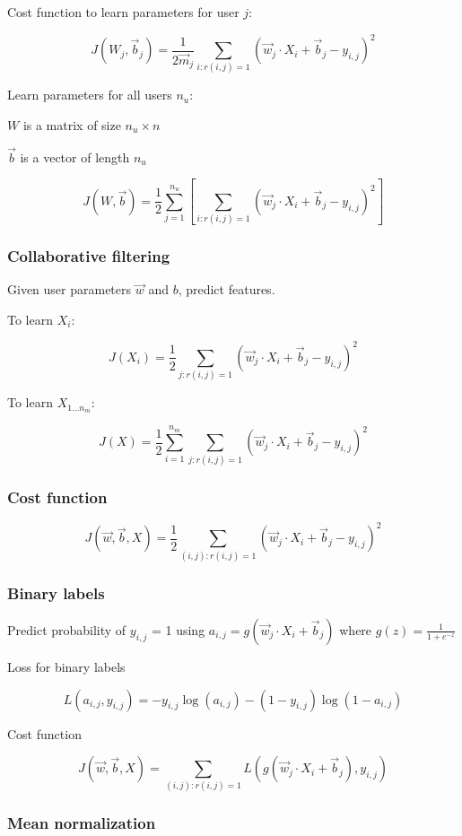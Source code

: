 \documentclass[12pt]{article}
\begin{document}
Cost function to learn parameters for user $j$:

\[ J(W_j,\vec{b}_j) = \frac{1}{2\vec m_j} \sum_{i:r(i,j)=1} (\vec w_j \cdot X_i + \vec b_j - y_{i,j})^2 \]

Learn parameters for all users $n_u$:

$W$ is a matrix of size $n_u \times n$

$\vec{b}$ is a vector of length $n_u$

\[ J(W,\vec{b}) = \frac{1}{2} \sum_{j=1}^{n_u} \left[ \sum_{i:r(i,j)=1} (\vec{w}_j \cdot X_i + \vec b_j - y_{i,j})^2 \right] \]

\subsubsection{Collaborative filtering}

Given user parameters $\vec{w}$ and $b$, predict features.

To learn $X_i$:

\[ J(X_i) = \frac 1 2 \sum_{j:r(i,j)=1} (\vec w_j \cdot X_i + \vec b_j - y_{i,j})^2 \]

To learn $X_{1 \ldots n_m}$:

\[ J(X) = \frac 1 2 \sum_{i=1}^{n_m} \sum_{j:r(i,j)=1} (\vec w_j \cdot X_i + \vec b_j - y_{i,j})^2 \]

\subsubsection{Cost function}

\[ J(\vec w, \vec b, X) = \frac 1 2 \sum_{(i,j):r(i,j)=1} (\vec w_j \cdot X_i + \vec b_j - y_{i,j})^2 \]

\subsubsection{Binary labels}

Predict probability of $y_{i,j}$ = 1 using $a_{i,j} = g(\vec w_j \cdot X_i + \vec b_j)$ where $g(z) = \frac 1 {1 + e^{-z}}$

Loss for binary labels

\[ L(a_{i,j},y_{i,j}) = -y_{i,j} \log(a_{i,j}) - (1 - y_{i,j}) \log(1 - a_{i,j}) \]

Cost function

\[ J(\vec w, \vec b, X) = \sum_{(i,j):r(i,j)=1} L(g(\vec w_j \cdot X_i + \vec b_j),y_{i,j}) \]

\subsubsection{Mean normalization}
\end{document}

